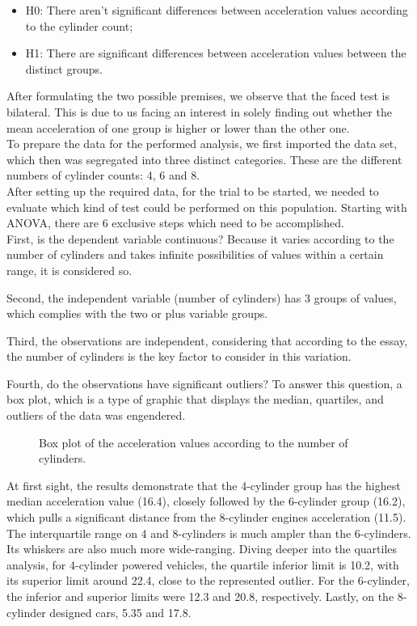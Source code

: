 \documentclass[conference]{IEEEtran}
\begin{document}
\begin{itemize}
    \item H0: There aren't significant differences between acceleration values according to the cylinder count;
    \item H1: There are significant differences between acceleration values between the distinct groups.
\end{itemize}

After formulating the two possible premises, we observe that the faced test is bilateral.
This is due to us facing an interest in solely finding out whether the mean acceleration of one group is higher or lower than the other one.\\

To prepare the data for the performed analysis, we first imported the data set, which then was segregated into three distinct categories.
These are the different numbers of cylinder counts: 4, 6 and 8.\\

After setting up the required data, for the trial to be started, we needed to evaluate which kind of test could be performed on this population.
Starting with ANOVA, there are 6 exclusive steps which need to be accomplished.\\

First, is the dependent variable continuous? Because it varies according to the number of cylinders and takes infinite possibilities of values within a certain range, it is considered so.

Second, the independent variable (number of cylinders) has 3 groups of values, which complies with the two or plus variable groups.

Third, the observations are independent, considering that according to the essay, the number of cylinders is the key factor to consider in this variation.

Fourth, do the observations have significant outliers? To answer this question, a box plot, which is a type of graphic that displays the median, quartiles, and outliers of the data was engendered.

\begin{figure}[htbp]
    \caption{Box plot of the acceleration values according to the number of cylinders.}
    \label{vehicle_boxplot}
\end{figure}

At first sight, the results demonstrate that the 4-cylinder group has the highest median acceleration value (16.4), closely followed by the 6-cylinder group (16.2), 
which pulls a significant distance from the 8-cylinder engines acceleration (11.5). 
The interquartile range on 4 and 8-cylinders is much ampler than the 6-cylinders.
Its whiskers are also much more wide-ranging. 
Diving deeper into the quartiles analysis, for 4-cylinder powered vehicles, the quartile inferior limit is 10.2, with its superior limit around 22.4, close to the represented outlier. 
For the 6-cylinder, the inferior and superior limits were 12.3 and 20.8, respectively.
Lastly, on the 8-cylinder designed cars, 5.35 and 17.8.
\end{document}
